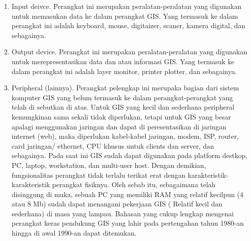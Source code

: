 \begin{enumerate}
\item Input deivce. Perangkat ini merupakan peralatan-peralatan yang digunakan untuk memasukan data ke dalam perangkat GIS. Yang termasuk ke dalam perangkat ini adalah keyboard, mouse, digitaizer, scaner, kamera digital, dan sebagainya.

\item Output device. Perangkat ini merupakan peralatan-peralatan yang digunakan untuk merepresentasikan data dan atau informasi GIS. Yang termasuk ke dalam perangkat ini adalah layer monitor, printer plotter, dan sebagainya.

\item Peripheral (lainnya). Perangkat pelengkap ini merupaka bagian dari sistem komputer GIS yang belum termasuk ke dalam perangkat-perangkat yang telah di sebutkan di atas. Untuk GIS yang kecil dan sederhana peripheral kemungkinan sama sekali tidak diperlukan, tetapi untuk GIS yang besar apalagi menggunakan jaringan dan dapat di peresentasikan di jaringan internet (web), maka diperlukan kabel-kabel jaringan, modem, ISP, router, card jaringan/ ethernet, CPU khusus untuk clients dan server, dan sebagainya.
Pada saat ini GIS sudah dapat digunakan pada platform destkop, PC, laptop, workstation, dan multi-user host. Dengan demikian, fungsionalitas perangkat tidak terlalu terikat erat dengan karakteristik-karakteristik perangkat fisiknya. Oleh sebab itu, sebagaimana telah disinggung di muka, sebuah PC yang memiliki RAM yang relatif kecilpun (4 atau 8 Mb) sudah dapat menangani pekerjaan GIS ( Relatif kecil dan sederhana) di masa yang lampau. Bahasan yang cukup lengkap mengenai perangkat keras pendukung GIS yang lahir pada pertengahan tahun 1980-an hingga di awal 1990-an dapat ditemukan.
\end{enumerate}